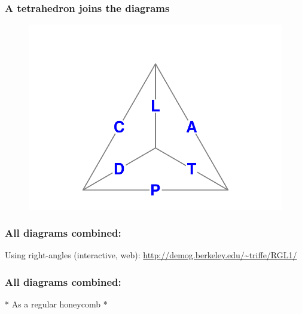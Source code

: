 \documentclass[20pt]{beamer}
\begin{document}
\begin{frame}
\frametitle{A tetrahedron joins the diagrams}
\begin{figure}[b]
    \centering
    \includegraphics{Figures/Tetra1prg.pdf}
    \end{figure}
\end{frame}

\begin{frame}
\frametitle{All diagrams combined:}
Using right-angles (interactive, web):
\url{http://demog.berkeley.edu/~triffe/RGL1/}

\end{frame}

\begin{frame}
\frametitle{All diagrams combined:}

* As a regular honeycomb *

\end{frame}
\end{document}
